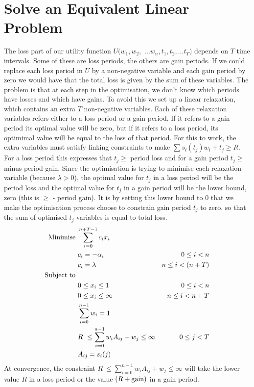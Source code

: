 \documentclass[12pt]{article}
\begin{document}
\section{Solve an Equivalent Linear Problem}
The loss part of our utility function $U(w_1,w_2,$ $...w_n,t_1,t_2,...t_T)$ depends on $T$ time intervals. Some of these
are loss periods, the others are gain periods. If we could replace each loss period in $U$ by a non-negative variable and each gain period by
zero we would have that the total loss is given by the sum of these variables. The problem is that at each step in the optimisation,
we don't know which periods have losses and which have gains. To avoid this we set up a linear relaxation, which contains an extra $T$ non-negative variables. Each of these relaxation variables
refers either to a loss period or a gain period. If it refers to a gain period its optimal value will be zero, but if it refers to a loss period,
its optimimal value will be equal to the loss of that period. For this to work, the extra variables must satisfy
linking constraints to make $\sum s_i( t_j )w_i +t_j \ge R$. For a loss period this expresses that $t_j \ge$ period loss and for a gain period
$t_j \ge$ minus period gain. Since the optimisation is trying to minimise each relaxation variable (because $\lambda > 0$), the optimal value 
for $t_j$ in a loss period will be the period loss and the optimal value for $t_j$ in a gain period will be the lower bound, zero (this is $\ge$ - period gain).
It is by setting this lower bound to 0 that we make the optimisation process choose to constrain gain period 
$t_j$ to zero, so that the sum of optimised $t_j$ variables is equal to total loss.
\begin{align}
    {\rm Minimise}\ & \sum_{i=0}^{n+T-1} c_i x_i\cr
    & c_i=-\alpha_i &0\le i < n\cr
    &c_i =\lambda &n\le i < (n+T)\cr
    {\rm Subject\ to}\ &\cr& 0 \le x_i \le 1\ &0\le i < n\cr
    & 0 \le x_i \le \infty\ &n\le i < n+T\cr
    & \sum_{i=0}^{n-1} w_i = 1\cr
    & R\ \le\sum_{i=0}^{n-1} w_i A_{ij} + w_j \le\infty &0\le j < T\cr
    & A_{ij} = s_i(j)\cr
\end{align}
At convergence, the constraint $R\ \le\sum_{i=0}^{n-1} w_i A_{ij} + w_j \le\infty$ will take the lower value $R$ in a loss period or the value $(R+{\rm gain})$ in a gain period.
\end{document}
